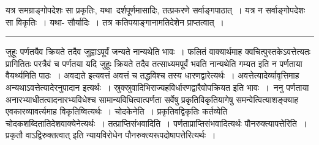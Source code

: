 \documentclass[11pt, openany]{book}
\begin{document}
{\bl यत्र समग्राङ्गोपदेशः सा प्रकृतिः, यथा\textemdash\ दर्शपूर्णमासादिः, तत्प्रकरणे सर्वाङ्गपाठात्~। यत्र न सर्वाङ्गोपदेशः सा विकृतिः~। यथा- सौर्यादिः~। तत्र कतिपयाङ्गानामतिदेशेन प्राप्तत्वात्~।}\\
\hrule
\vspace{3mm}
\noindent
जुहूः पर्णतयैव क्रियते तदैव जुह्वाऽपूर्वं जन्यते नान्यथेति भावः~। फलितं वाक्यार्थमाह क्वचित्पुस्तकेऽवत्तेत्यतः प्रागितितः परत्रैवं च पर्णतया यदि जुहूः क्रियते तदैव तत्साध्यमपूर्वं भवति नान्यथेति गम्यत इति न पर्णताया वैयर्थ्यमिति पाठः~। अवद्यते इत्यवत्तं अवत्तं च तद्धविश्च तस्य धारणद्वारेत्यर्थः~।
अवत्तेत्यादेर्व्यावृत्तिमाह अन्यथाऽवत्तेत्यादेरनुपादान इत्यर्थः~। स्रुक्स्रुवादिभिराज्यहविर्धारणद्वारैवोपक्रियत इति भावः~।~{\br ननु} पर्णताया अनारभ्याधीतत्वादनारभ्यविधेश्च सामान्यविधित्वात्पर्णता सर्वेषु प्रकृतिविकृतियागेषु समन्वेत्वित्याशङ्क्याह एवकारव्यावर्त्यमाह  विकृतिष्वित्यर्थः~। {\br चोदकेनेति~।} प्रकृतिवद्विकृतिः कर्तव्येति चोदकशब्दितातिदेशवाक्येनेत्यर्थः~। {\br तत्प्राप्तिसंभवादिति~।} पर्णताप्राप्तिसंभवादित्यर्थः {\br पौनरुक्त्यापत्तेरिति~।} {\qt प्रकृतौ वाऽद्विरुक्तत्वात्} इति न्यायविरोधेन पौनरुक्त्यरूपदोषापत्तेरित्यर्थः~।\\
\end{document}
